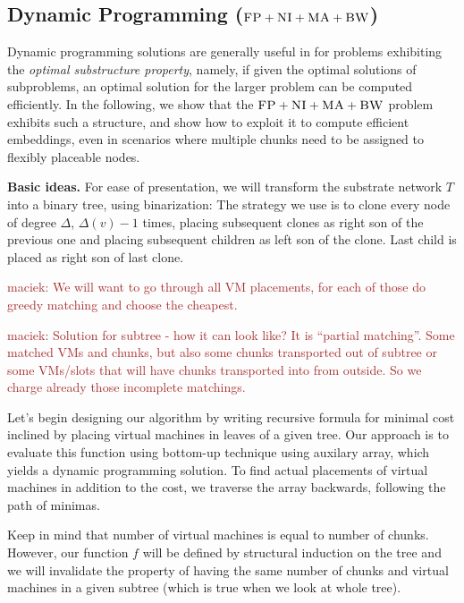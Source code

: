 \documentclass[9pt,twocolumn]{scrartcl}
\newcommand{\maciek}[1]{\textcolor{brown}{maciek: #1}}
\newcommand{\CC}{\textsc{NI}}
\newcommand{\FP}{\textsc{FP}}
\newcommand{\BW}{\textsc{BW}}
\newcommand{\MA}{\textsc{MA}}
\newcommand{\Tree}{\ensuremath{T}}
\begin{document}
\subsection{Dynamic Programming ($\FP+\CC+\MA+\BW$)}

Dynamic programming solutions are generally useful in for problems
exhibiting the \emph{optimal substructure property}, namely, if given
the optimal solutions of subproblems, an optimal solution for the
larger problem can be computed efficiently. 
In the following, we show that the $\FP+\CC+\MA+\BW$ problem
exhibits such a structure, and show how to exploit it to
compute efficient embeddings, even in scenarios where multiple chunks
need to be assigned to flexibly placeable nodes.

\textbf{Basic ideas.} For ease of presentation, we will transform the substrate network $\Tree$
into a binary tree, using binarization: 
The
strategy we use is to clone every node of degree $\Delta$, $\Delta(v) - 1$ times,
placing subsequent clones as right son of the previous one and placing
subsequent children as left son of the clone. Last child is placed as
right son of last clone.


\maciek{We will want to go through all VM placements, for each of those do greedy matching and choose the cheapest.}

\maciek{Solution for subtree - how it can look like? It is ``partial matching''. Some matched VMs and chunks, but also some chunks transported out of subtree or some VMs/slots that will have chunks transported into from outside. So we charge already those incomplete matchings.}

Let's begin designing our algorithm by writing recursive formula for
minimal cost inclined by placing virtual machines in leaves of a given
tree. Our approach is to evaluate this function using bottom-up
technique using auxilary array, which yields a dynamic programming
solution. To find actual placements of virtual machines in addition to
the cost, we traverse the array backwards, following the path of
minimas.

Keep in mind that number of virtual machines is equal to number of
chunks. However, our function $f$ will be defined by structural
induction on the tree and we will invalidate the property of having
the same number of chunks and virtual machines in a given subtree
(which is true when we look at whole tree).
\end{document}
